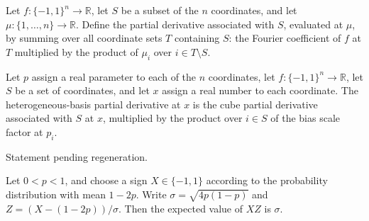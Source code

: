 \begin{definition}
\label{FABL.cubePartialDerivativeAt}
\leanok
{}
Let $f:\{−1,1\}^n\to\mathbb R$, let $S$ be a subset of the $n$ coordinates, and let
$\mu:\{1,\ldots,n\}\to\mathbb R$. Define the partial derivative associated with $S$,
evaluated at $\mu$, by summing over all coordinate sets $T$ containing $S$: the Fourier
coefficient of $f$ at $T$ multiplied by the product of $\mu_i$ over $i\in T\setminus S$.
\end{definition}

\begin{definition}
\label{FABL.heterogeneousBasisPartialDerivativeAt}
\leanok
{}
Let $p$ assign a real parameter to each of the $n$ coordinates, let
$f:\{−1,1\}^n\to\mathbb R$, let $S$ be a set of coordinates, and let $x$ assign a real
number to each coordinate. The heterogeneous-basis partial derivative at $x$ is the cube
partial derivative associated with $S$ at $x$, multiplied by the product over $i\in S$
of the bias scale factor at $p_i$.
\end{definition}

\begin{theorem}
\label{FABL.heterogeneousBasisPartialDerivativeAt_eq_prod_sigma_mul}
\leanok
{}
Statement pending regeneration.
\end{theorem}

\begin{theorem}
\label{FABL.pmfExpectation_biasedSignPMF_sign_mul_standardized}
\leanok
{}
Let $0<p<1$, and choose a sign $X\in\{-1,1\}$ according to the probability distribution
with mean $1-2p$. Write $\sigma=\sqrt{4p(1-p)}$ and $Z=(X-(1-2p))/\sigma$. Then the
expected value of $XZ$ is $\sigma$.
\end{theorem}

